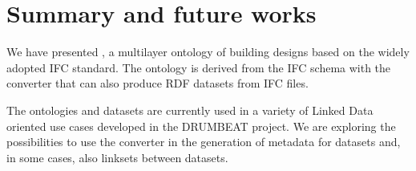 \section{Summary and future works}
\label{sec:summary}

We have presented \ifcowl{}, a multilayer ontology of building designs based on the widely adopted IFC standard. The ontology is 
derived from the IFC schema with the \ifcld{} converter that can also produce RDF datasets from IFC files. 

The \ifcowl{} ontologies and \ifcrdf{} datasets are currently used in a variety of Linked Data oriented use cases \cite{torma2013semantic} developed in the DRUMBEAT project. We are exploring the possibilities to use the \ifcld{} converter in the generation of metadata for \ifcrdf{} datasets and, in some cases, also linksets between datasets.


